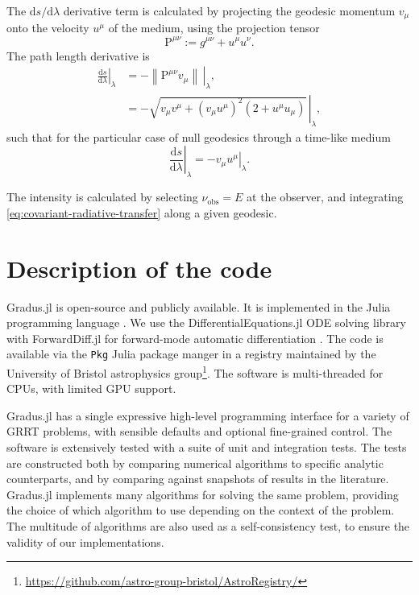 \documentclass[fleqn,usenatbib]{mnras}
\newcommand{\Gradus}{Gradus.jl\xspace}
\renewcommand{\d}{\text{d}}
\begin{document}
The $\d s / \d \lambda$ derivative term is calculated by projecting the geodesic
momentum $v_\mu$ onto the velocity $u^\mu$ of the medium, using the projection
tensor
\begin{equation}
    \mathrm{P}^{\mu\nu} := g^{\mu\nu} + u^\mu u^\nu.
\end{equation}
The path length derivative is
\begin{align}
    \left. \frac{\d s}{\d \lambda} \right\rvert_\lambda
    &= - \left. \left\lVert \mathrm{P}^{\mu\nu} v_\mu\right\rVert\, \right\rvert_\lambda,\\
    &= - \left. \sqrt{v_\mu v^\mu + \left(v_\mu u^\mu\right)^2 \left(2 + u^\mu u_\mu\right)} \, \right\rvert_\lambda,
\end{align}
such that for the particular case of null geodesics through a time-like medium
\begin{equation}
    \left. \frac{\d s}{\d \lambda} \right\rvert_\lambda = - \left. v_\mu u^\mu \right\rvert_\lambda.
\end{equation}

The intensity is calculated by selecting $\nu_\text{obs} = E$ at the observer,
and integrating \eqref{eq:covariant-radiative-transfer} along a given geodesic.

\section{Description of the code}
\label{sec:description-of-code}

\Gradus is open-source and publicly available. It is implemented in the Julia
programming language \citep{Bezanson_Julia_A_fresh_2017}. We use the
DifferentialEquations.jl ODE solving library with ForwardDiff.jl for
forward-mode automatic differentiation \citep{RevelsLubinPapamarkou2016}. The
code is available via the \texttt{Pkg} Julia package manger in a registry
maintained by the University of Bristol astrophysics
group\footnote{\url{https://github.com/astro-group-bristol/AstroRegistry/}}. The
software is multi-threaded for CPUs, with limited GPU support.

\Gradus has a single expressive high-level programming interface for a variety
of GRRT problems, with sensible defaults and optional fine-grained control. The
software is extensively tested with a suite of unit and integration tests. The
tests are constructed both by comparing numerical algorithms to specific
analytic counterparts, and by comparing against snapshots of results in the
literature. \Gradus implements many algorithms for solving the same problem,
providing the choice of which algorithm to use depending on the context of the
problem. The multitude of algorithms are also used as a self-consistency test,
to ensure the validity of our implementations.
\end{document}
